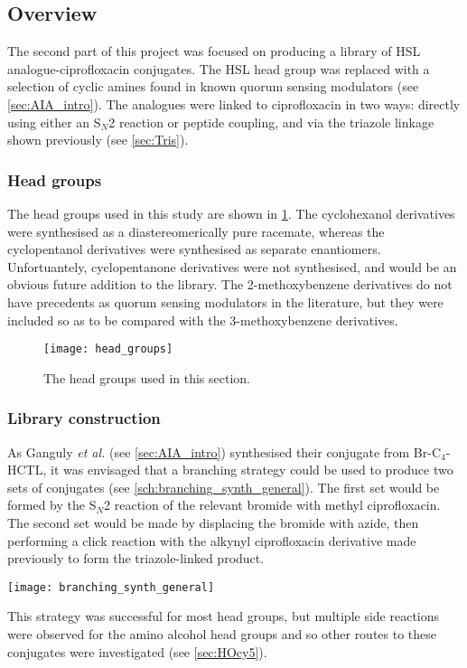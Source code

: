 \subsection{Overview}

The second part of this project was focused on producing a library of HSL analogue-ciprofloxacin conjugates. The HSL head group was replaced with a selection of cyclic amines found in known quorum sensing modulators (see \ref{sec:AIA_intro}). 
The analogues were linked to ciprofloxacin  in two ways: directly using either an S$_N$2 reaction or peptide coupling, and via the triazole linkage shown previously (see \ref{sec:Tris}).

\subsubsection{Head groups}

The head groups used in this study are shown in \ref{fig:head_groups}. The cyclohexanol derivatives were synthesised as a diastereomerically pure racemate, whereas the cyclopentanol derivatives were synthesised as separate enantiomers. Unfortuantely, cyclopentanone derivatives were not synthesised, and would be an obvious future addition to the library. The 2-methoxybenzene derivatives do not have precedents as quorum sensing modulators in the literature, but they were included so as to be compared with the 3-methoxybenzene derivatives.

\begin{figure}[H]
	\begin{center}
		\texttt{[image: head\_groups]}
		\caption{The head groups used in this section.\label{fig:head_groups}}
	\end{center}
\end{figure}

\subsubsection{Library construction}

As Ganguly \textit{et al.}\cite{Ganguly2011}  (see \ref{sec:AIA_intro}) synthesised their conjugate from Br-C$_4$-HCTL, it was envisaged that a branching strategy could be used to produce two sets of conjugates (see \ref{sch:branching_synth_general}). The first set would be formed by the S$_N$2 reaction of the relevant bromide with methyl ciprofloxacin. The second set would be made by displacing the bromide with azide, then performing a click reaction with the alkynyl ciprofloxacin derivative  made previously to form the triazole-linked product.

\begin{scheme}[H]
	\begin{center}
		\texttt{[image: branching\_synth\_general]}
		\caption{\label{sch:branching_synth_general}}
	\end{center}
\end{scheme}

This strategy was successful for most head groups, but multiple side reactions were observed for the amino alcohol head groups and so other routes to these conjugates were investigated (see \ref{sec:HOcy5}).
